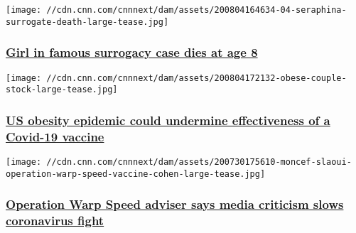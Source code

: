 \href{/2020/08/04/health/seraphina-surrogate-death/index.html}{}

\texttt{[image: //cdn.cnn.com/cnnnext/dam/assets/200804164634-04-seraphina-surrogate-death-large-tease.jpg]}

\hypertarget{girl-in-famous-surrogacy-case-dies-at-age-8-}{%
\subsubsection{\texorpdfstring{\href{/2020/08/04/health/seraphina-surrogate-death/index.html}{Girl
in famous surrogacy case dies at age 8
}}{Girl in famous surrogacy case dies at age 8 }}\label{girl-in-famous-surrogacy-case-dies-at-age-8-}}

\href{/2020/08/05/health/obesity-covid-vaccine-effectiveness-wellness/index.html}{}

\texttt{[image: //cdn.cnn.com/cnnnext/dam/assets/200804172132-obese-couple-stock-large-tease.jpg]}

\hypertarget{us-obesity-epidemic-could-undermine-effectiveness-of-a-covid-19-vaccine-}{%
\subsubsection{\texorpdfstring{\href{/2020/08/05/health/obesity-covid-vaccine-effectiveness-wellness/index.html}{US
obesity epidemic could undermine effectiveness of a Covid-19 vaccine
}}{US obesity epidemic could undermine effectiveness of a Covid-19 vaccine }}\label{us-obesity-epidemic-could-undermine-effectiveness-of-a-covid-19-vaccine-}}

\href{/2020/08/04/health/coronavirus-warp-speed-adviser-media/index.html}{}

\texttt{[image: //cdn.cnn.com/cnnnext/dam/assets/200730175610-moncef-slaoui-operation-warp-speed-vaccine-cohen-large-tease.jpg]}

\hypertarget{operation-warp-speed-adviser-says-media-criticism-slows-coronavirus-fight}{%
\subsubsection{\texorpdfstring{\href{/2020/08/04/health/coronavirus-warp-speed-adviser-media/index.html}{Operation
Warp Speed adviser says media criticism slows coronavirus
fight}}{Operation Warp Speed adviser says media criticism slows coronavirus fight}}\label{operation-warp-speed-adviser-says-media-criticism-slows-coronavirus-fight}}

\href{/videos/us/2020/08/05/covid-victim-spouse-david-hart-ac360-sot-vpx.cnn}{}

